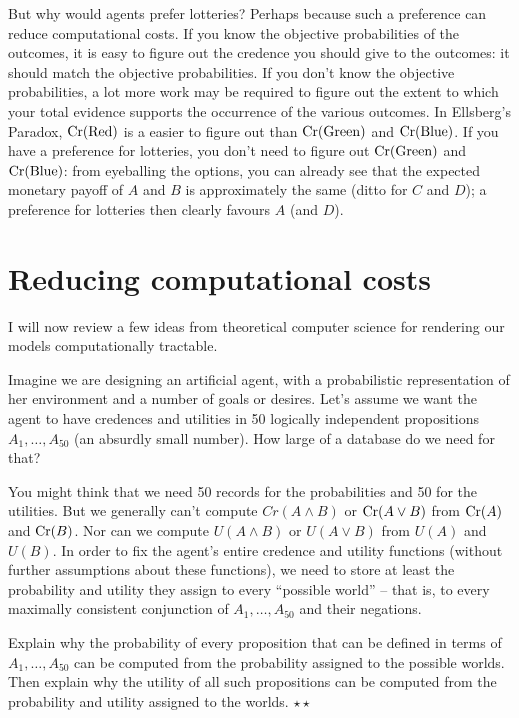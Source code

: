 But why would agents prefer lotteries? Perhaps because such a
preference can reduce computational costs. If you know the objective
probabilities of the outcomes, it is easy to figure out the credence
you should give to the outcomes: it should match the objective
probabilities. If you don't know the objective probabilities, a lot
more work may be required to figure out the extent to which your total
evidence supports the occurrence of the various outcomes. In
Ellsberg's Paradox, $\text{Cr}(\text{Red})$ is a easier to figure out than
$\text{Cr}(\text{Green})$ and $\text{Cr}(\text{Blue})$. If you have a preference
for lotteries, you don't need to figure out $\text{Cr}(\text{Green})$ and
$\text{Cr}(\text{Blue})$: from eyeballing the options, you can already see
that the expected monetary payoff of $A$ and $B$ is approximately the
same (ditto for $C$ and $D$); a preference for lotteries then clearly
favours $A$ (and $D$).


\section{Reducing computational costs}

I will now review a few ideas from theoretical computer science for
rendering our models computationally tractable.

Imagine we are designing an artificial agent, with a probabilistic
representation of her environment and a number of goals or
desires. Let's assume we want the agent to have credences and
utilities in 50 logically independent propositions
$A_1,\ldots,A_{50}$ (an absurdly small number).
How large of a database do we need for that?

You might think that we need 50 records for the probabilities and 50
for the utilities. But we generally can't compute $Cr(A \land B)$ or
$\text{Cr}(A \lor B)$ from $\text{Cr}(A)$ and $\text{Cr}(B)$. Nor can we compute $U(A
\land B)$ or $U(A \lor B)$ from $U(A)$ and $U(B)$. In order to fix the
agent's entire credence and utility functions (without further
assumptions about these functions), we need to store at least the
probability and utility they assign to every ``possible world'' --
that is, to every maximally consistent conjunction of
$A_1,\ldots,A_{50}$ and their negations.

\begin{exercise}
  Explain why the probability of every proposition that can be defined
  in terms of $A_1,\ldots,A_{50}$ can be computed from the probability
  assigned to the possible worlds. Then explain why the utility of all
  such propositions can be computed from the probability and utility
  assigned to the worlds. $\star\star$
\end{exercise}

